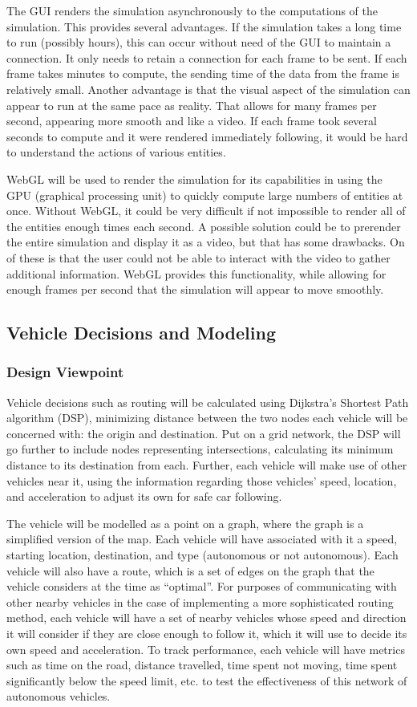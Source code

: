\documentclass[onecolumn, draftclsnofoot,10pt, compsoc]{IEEEtran}
\begin{document}
The GUI renders the simulation asynchronously to the computations of the simulation.
This provides several advantages.
If the simulation takes a long time to run (possibly hours), this can occur without need of the GUI to maintain a connection.
It only needs to retain a connection for each frame to be sent.
If each frame takes minutes to compute, the sending time of the data from the frame is relatively small.
Another advantage is that the visual aspect of the simulation can appear to run at the same pace as reality.
That allows for many frames per second, appearing more smooth and like a video.
If each frame took several seconds to compute and it were rendered immediately following, it would be hard to understand the actions of various entities.

WebGL will be used to render the simulation for its capabilities in using the GPU (graphical processing unit) to quickly compute large numbers of entities at once.
Without WebGL, it could be very difficult if not impossible to render all of the entities enough times each second.
A possible solution could be to prerender the entire simulation and display it as a video, but that has some drawbacks.
On of these is that the user could not be able to interact with the video to gather additional information.
WebGL provides this functionality, while allowing for enough frames per second that the simulation will appear to move smoothly.
\subsection{Vehicle Decisions and Modeling}
\subsubsection{Design Viewpoint}
Vehicle decisions such as routing will be calculated using Dijkstra’s Shortest Path algorithm (DSP), minimizing distance between the two nodes each vehicle will be concerned with: the origin and destination.
Put on a grid network, the DSP will go further to include nodes representing intersections, calculating its minimum distance to its destination from each.
Further, each vehicle will make use of other vehicles near it, using the information regarding those vehicles' speed, location, and acceleration to adjust its own for safe car following.

The vehicle will be modelled as a point on a graph, where the graph is a simplified version of the map.
Each vehicle will have associated with it a speed, starting location, destination, and type (autonomous or not autonomous).
Each vehicle will also have a route, which is a set of edges on the graph that the vehicle considers at the time as “optimal”.
For purposes of communicating with other nearby vehicles in the case of implementing a more sophisticated routing method, each vehicle will have a set of nearby vehicles whose speed and direction it will consider if they are close enough to follow it, which it will use to decide its own speed and acceleration.
To track performance, each vehicle will have metrics such as time on the road, distance travelled, time spent not moving, time spent significantly below the speed limit, etc. to test the effectiveness of this network of autonomous vehicles.
\end{document}

